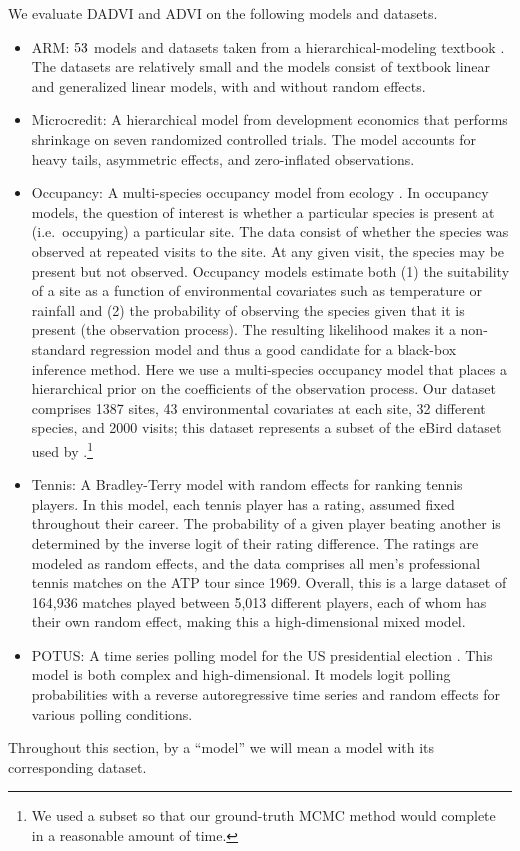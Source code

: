 We evaluate DADVI and ADVI on the following models and datasets.
%
\begin{itemize}
%
    \item ARM: $53$ models and datasets taken from a
    hierarchical-modeling textbook \citep{gelman:2006:arm}.  The datasets are
    relatively small and the models consist of textbook linear and generalized
    linear models, with and without random effects.
    \item Microcredit: A hierarchical model from development economics
    \citep{meager:2019:microcredit} that performs shrinkage on seven
    randomized controlled trials. The model accounts for heavy tails, asymmetric
    effects, and zero-inflated observations.
    \item Occupancy: A multi-species occupancy model from ecology
    \citep{ingram:2022:occupancy,kery:2009:speciesrichness}. In occupancy
    models, the question of interest is whether a particular species is present
    at (i.e.\ occupying) a particular site. The data consist of whether the
    species was observed at repeated visits to the site. At any given visit, the
    species may be present but not observed. Occupancy models estimate both (1)
    the suitability of a site as a function of environmental covariates such as
    temperature or rainfall and (2) the probability of observing the species
    given that it is present (the observation process). The resulting likelihood
    makes it a non-standard regression model and thus a good candidate for a
    black-box inference method. Here we use a multi-species occupancy model that
    places a hierarchical prior on the coefficients of the observation process.
    Our dataset comprises 1387 sites, 43 environmental covariates at each site,
    32 different species, and 2000 visits; this dataset represents a subset of
    the eBird dataset used by \cite{ingram:2022:occupancy}.\footnote{We used a
    subset so that our ground-truth MCMC method would complete in a reasonable
    amount of time.}
    \item Tennis: A Bradley-Terry model with random effects for ranking tennis
    players. In this model, each tennis player has a rating, assumed
    fixed throughout their career. The probability of a given player beating
    another is determined by the inverse logit of their rating difference.
    The ratings are modeled as random effects, and the data comprises all
    men's professional tennis matches on the ATP tour since 1969. Overall,
    this is a large dataset of 164,936 matches played between 5,013 different players,
    each of whom has their own random effect, making this a high-dimensional mixed model.
    \item POTUS: A time series polling model for the US presidential election
    \citep{heidemanns:2020:presidential}.  This model is both complex and
    high-dimensional. It models logit polling probabilities with a reverse
    autoregressive time series and random effects for various polling
    conditions.
%
\end{itemize}
%
Throughout this section, by a ``model'' we will mean a model with its
corresponding dataset.


